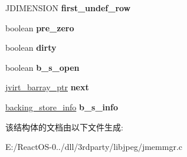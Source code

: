 \begin{DoxyCompactItemize}
J\+D\+I\+M\+E\+N\+S\+I\+ON {\bfseries first\+\_\+undef\+\_\+row}
\item 
\mbox{\label{structjvirt__barray__control_a40d3b399333a4d0468c7fcb4465e4cdd}} 
boolean {\bfseries pre\+\_\+zero}
\item 
\mbox{\label{structjvirt__barray__control_a324c033c65e470a10556ba02619c453c}} 
boolean {\bfseries dirty}
\item 
\mbox{\label{structjvirt__barray__control_a5b588561840b293882bcf69e690962b2}} 
boolean {\bfseries b\+\_\+s\+\_\+open}
\item 
\mbox{\label{structjvirt__barray__control_ae4b8dea777dcac10f1de982f0bedac0e}} 
\hyperlink{structjvirt__barray__control}{jvirt\+\_\+barray\+\_\+ptr} {\bfseries next}
\item 
\mbox{\label{structjvirt__barray__control_a6b33df0220c0545b4d7c7a8563a7fb18}} 
\hyperlink{structbacking__store__struct}{backing\+\_\+store\+\_\+info} {\bfseries b\+\_\+s\+\_\+info}
\end{DoxyCompactItemize}


该结构体的文档由以下文件生成\+:\begin{DoxyCompactItemize}
\item 
E\+:/\+React\+O\+S-\/0../dll/3rdparty/libjpeg/jmemmgr.\+c\end{DoxyCompactItemize}
